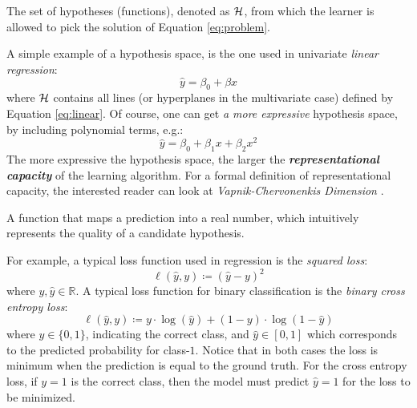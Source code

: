 \begin{definition}
	The set of hypotheses (functions), denoted as $\mathcal{H}$, from which the
	learner is allowed to pick the solution of Equation \ref{eq:problem}.
\end{definition}

A simple example of a hypothesis space, is the one used in univariate
\emph{linear regression}:
\begin{equation}
	\label{eq:linear}
	\hat{y} = \beta_0 + \beta x
\end{equation}
where $\mathcal{H}$ contains all lines (or hyperplanes in the multivariate case)
defined by Equation \ref{eq:linear}. Of course, one can get \emph{a
more expressive} hypothesis space, by including polynomial terms, e.g.:
\begin{equation}
	\label{eq:polynomial}
	\hat{y} = \beta_0 + \beta_1 x + \beta_2 x^2
\end{equation}
The more expressive the hypothesis space, the larger the
\emph{\textbf{representational capacity}} of
the learning algorithm. For a formal definition of representational capacity,
the interested reader can look at \emph{Vapnik-Chervonenkis
Dimension} \parencite{Hastie2009}.

\begin{definition}
	A function that maps a prediction into a real number, which intuitively
	represents the quality of a candidate hypothesis.
\end{definition}

For example, a typical loss function used in regression is the \emph{squared
loss}:
\begin{equation}
	\label{eq:squared_loss}
	\ell(\hat{y}, y) \coloneqq (\hat{y} - y)^2
\end{equation}
where $y, \hat{y} \in \mathbb{R}$. A typical loss function for binary
classification is the \emph{binary cross entropy
loss}:
\begin{equation}
	\label{eq:cross_entropy}
	\ell(\hat{y}, y) \coloneqq y \cdot \log (\hat{y})
	+ (1 - y) \cdot \log (1 - \hat{y})
\end{equation}
where $y \in \{0, 1\}$, indicating the correct class, and $\hat{y} \in [0, 1]$
which corresponds to the predicted probability for class-$1$. Notice that in
both cases the loss is minimum when the prediction is equal to the ground truth.
For the cross entropy loss, if $y=1$ is the correct class, then the model must
predict $\hat{y}=1$ for the loss to be minimized.

